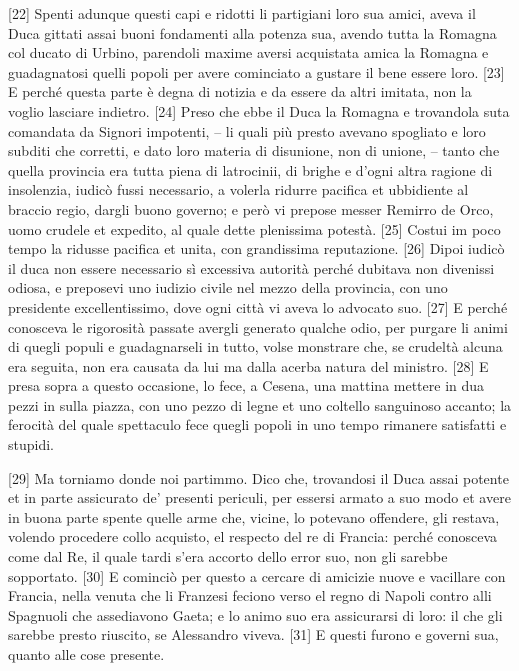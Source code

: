 {[}22{]} Spenti adunque questi capi e ridotti li partigiani loro sua
amici, aveva il Duca gittati assai buoni fondamenti alla potenza sua,
avendo tutta la Romagna col ducato di Urbino, parendoli maxime aversi
acquistata amica la Romagna e guadagnatosi quelli popoli per avere
cominciato a gustare il bene essere loro. {[}23{]} E perché questa parte
è degna di notizia e da essere da altri imitata, non la voglio lasciare
indietro. {[}24{]} Preso che ebbe il Duca la Romagna e trovandola suta
comandata da Signori impotenti, -- li quali più presto avevano spogliato
e loro subditi che corretti, e dato loro materia di disunione, non di
unione, -- tanto che quella provincia era tutta piena di latrocinii, di
brighe e d'ogni altra ragione di insolenzia, iudicò fussi necessario, a
volerla ridurre pacifica et ubbidiente al braccio regio, dargli buono
governo; e però vi prepose messer Remirro de Orco, uomo crudele et
expedito, al quale dette plenissima potestà. {[}25{]} Costui im poco
tempo la ridusse pacifica et unita, con grandissima reputazione.
{[}26{]} Dipoi iudicò il duca non essere necessario sì excessiva
autorità perché dubitava non divenissi odiosa, e preposevi uno iudizio
civile nel mezzo della provincia, con uno presidente excellentissimo,
dove ogni città vi aveva lo advocato suo. {[}27{]} E perché conosceva le
rigorosità passate avergli generato qualche odio, per purgare li animi
di quegli populi e guadagnarseli in tutto, volse monstrare che, se
crudeltà alcuna era seguita, non era causata da lui ma dalla acerba
natura del ministro. {[}28{]} E presa sopra a questo occasione, lo fece,
a Cesena, una mattina mettere in dua pezzi in sulla piazza, con uno
pezzo di legne et uno coltello sanguinoso accanto; la ferocità del quale
spettaculo fece quegli popoli in uno tempo rimanere satisfatti e
stupidi.

{[}29{]} Ma torniamo donde noi partimmo. Dico che, trovandosi il Duca
assai potente et in parte assicurato de' presenti periculi, per essersi
armato a suo modo et avere in buona parte spente quelle arme che,
vicine, lo potevano offendere, gli restava, volendo procedere collo
acquisto, el respecto del re di Francia: perché conosceva come dal Re,
il quale tardi s'era accorto dello error suo, non gli sarebbe
sopportato. {[}30{]} E cominciò per questo a cercare di amicizie nuove e
vacillare con Francia, nella venuta che li Franzesi feciono verso el
regno di Napoli contro alli Spagnuoli che assediavono Gaeta; e lo animo
suo era assicurarsi di loro: il che gli sarebbe presto riuscito, se
Alessandro viveva. {[}31{]} E questi furono e governi sua, quanto alle
cose presente.

